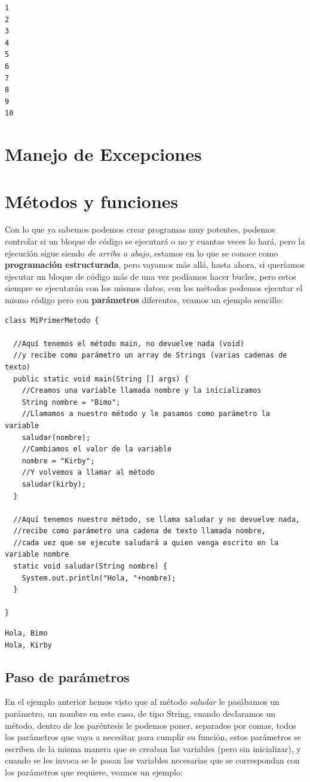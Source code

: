 \documentclass[11pt]{article}
\begin{document}
\begin{verbatim}
1
2
3
4
5
6
7
8
9
10 
\end{verbatim}

\section{Manejo de Excepciones}
\label{sec:org68d37a6}
\section{Métodos y funciones}
\label{sec:org88e2415}
Con lo que ya sabemos podemos crear programas muy potentes, podemos controlar si un bloque de código se ejecutará o no y cuantas veces lo hará, pero la ejecución sigue siendo \emph{de arriba a abajo}, estamos en lo que se conoce como \textbf{programación estructurada}, pero vayamos más allá, hasta ahora, si queríamos ejecutar un bloque de código más de una vez podíamos hacer bucles, pero estos siempre se ejecutarán con los mismos datos, con los métodos podemos ejecutar el mismo código pero con \textbf{parámetros} diferentes, veamos un ejemplo sencillo:

\begin{verbatim}
class MiPrimerMetodo {

  //Aquí tenemos el método main, no devuelve nada (void)
  //y recibe como parámetro un array de Strings (varias cadenas de texto)
  public static void main(String [] args) {
    //Creamos una variable llamada nombre y la inicializamos
    String nombre = "Bimo";
    //Llamamos a nuestro método y le pasamos como parámetro la variable
    saludar(nombre);
    //Cambiamos el valor de la variable
    nombre = "Kirby";
    //Y volvemos a llamar al método
    saludar(kirby);
  }

  //Aquí tenemos nuestro método, se llama saludar y no devuelve nada,
  //recibe como parámetro una cadena de texto llamada nombre,
  //cada vez que se ejecute saludará a quien venga escrito en la variable nombre
  static void saludar(String nombre) {
    System.out.println("Hola, "+nombre);
  }

}
\end{verbatim}

\begin{verbatim}
Hola, Bimo
Hola, Kirby
\end{verbatim}

\subsection{Paso de parámetros}
\label{sec:org063aa80}
En el ejemplo anterior hemos visto que al método \emph{saludar} le pasábamos un parámetro, un nombre en este caso, de tipo String, cuando declaramos un método, dentro de los paréntesis le podemos poner, separados por comas, todos los parámetros que vaya a necesitar para cumplir su función, estos parámetros se escriben de la misma manera que se creaban las variables (pero sin inicializar), y cuando se les invoca se le pasan las variables necesarias que se correspondan con los parámetros que requiere, veamos un ejemplo:
\end{document}

